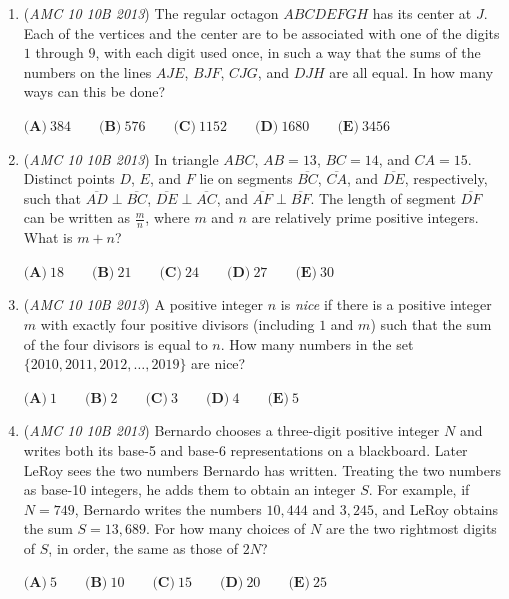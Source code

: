 \begin{enumerate}
	\item (\textit{AMC 10 10B 2013}) The regular octagon $ABCDEFGH$ has its center at $J$.  Each of the vertices and the center are to be associated with one of the digits $1$ through $9$, with each digit used once, in such a way that the sums of the numbers on the lines $AJE$, $BJF$, $CJG$, and $DJH$ are all equal.  In how many ways can this be done?


 $\textbf{(A)}\ 384 \qquad\textbf{(B)}\ 576  \qquad\textbf{(C)}\ 1152 \qquad\textbf{(D)}\ 1680 \qquad\textbf{(E)}\ 3456$


	\item (\textit{AMC 10 10B 2013}) In triangle $ABC$, $AB = 13$, $BC = 14$, and $CA = 15$. Distinct points $D$, $E$, and $F$ lie on segments $\overline{BC}$, $\overline{CA}$, and $\overline{DE}$, respectively, such that $\overline{AD} \perp \overline{BC}$, $\overline{DE} \perp \overline{AC}$, and $\overline{AF} \perp \overline{BF}$. The length of segment $\overline{DF}$ can be written as $\frac{m}{n}$, where $m$ and $n$ are relatively prime positive integers. What is $m + n$?


 

$\textbf{(A)}\ 18\qquad\textbf{(B)}\ 21\qquad\textbf{(C)}\ 24\qquad\textbf{(D)}\ 27\qquad\textbf{(E)}\ 30$


	\item (\textit{AMC 10 10B 2013}) A positive integer $n$ is \textit{nice} if there is a positive integer $m$ with exactly four positive divisors (including $1$ and $m$) such that the sum of the four divisors is equal to $n$. How many numbers in the set $\{ 2010,2011,2012,\dotsc,2019 \}$ are nice?


 

$\textbf{(A)}\ 1 \qquad\textbf{(B)}\ 2 \qquad\textbf{(C)}\ 3 \qquad\textbf{(D)}\ 4 \qquad\textbf{(E)}\ 5$


	\item (\textit{AMC 10 10B 2013}) Bernardo chooses a three-digit positive integer $N$ and writes both its base-5 and base-6 representations on a blackboard. Later LeRoy sees the two numbers Bernardo has written. Treating the two numbers as base-10 integers, he adds them to obtain an integer $S$. For example, if $N = 749$, Bernardo writes the numbers $10,444$ and $3,245$, and LeRoy obtains the sum $S = 13,689$. For how many choices of $N$ are the two rightmost digits of $S$, in order, the same as those of $2N$?


 $\textbf{(A)}\ 5 \qquad\textbf{(B)}\ 10 \qquad\textbf{(C)}\ 15 \qquad\textbf{(D)}\ 20 \qquad\textbf{(E)}\ 25$


\end{enumerate}